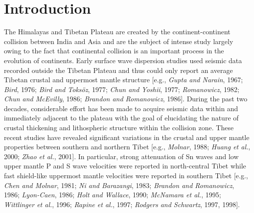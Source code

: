 \documentclass[12pt]{article}
\begin{document}
\section{Introduction} 

The Himalayas and Tibetan Plateau are created by the continent-continent collision between India and Asia 
and are the subject of intense study largely owing to the fact that continental collision is an important 
process in the evolution of continents.  Early  surface wave dispersion 
studies used seismic data recorded outside the Tibetan Plateau and
thus could only report an average Tibetan 
crustal and uppermost mantle structure [e.g., {\it Gupta and Narain}, 1967; {\it Bird}, 1976; 
{\it Bird and Toks\"oz}, 1977; 
{\it Chun and Yoshii}, 1977; {\it Romanowicz}, 1982; {\it Chun and McEvilly}, 1986;  {\it Brandon and 
Romanowicz}, 1986].  During the past two decades, considerable effort has been made to acquire seismic data 
within and immediately adjacent to the plateau with the goal of elucidating the nature of crustal 
thickening and lithospheric structure within the collision zone.  These recent studies have revealed 
significant variations in the crustal and upper mantle properties between southern and northern Tibet 
[e.g., {\it Molnar}, 1988; {\it Huang et al.}, 2000; {\it Zhao et al.}, 2001].  In particular, strong 
attenuation of Sn waves and low upper mantle P and S wave velocities were reported in north-central Tibet 
while fast shield-like uppermost mantle velocities were reported in southern Tibet [e.g., {\it Chen and 
Molnar}, 1981; {\it Ni and Barazangi}, 1983; {\it Brandon and Romanowicz}, 1986; {\it Lyon-Caen}, 1986; 
{\it Holt and Wallace}, 1990; {\it McNamara et al.}, 1995; {\it Wittlinger et al.}, 1996; 
{\it Rapine et al.}, 1997; {\it Rodgers and Schwartz}, 1997, 1998]. 
\end{document}

